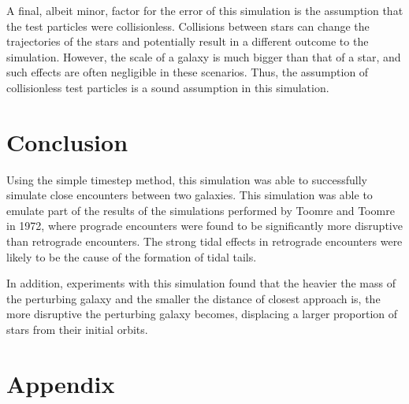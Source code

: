 \documentclass[twoside,twocolumn]{article}
\begin{document}
        A final, albeit minor, factor for the error of this simulation is the assumption that the test particles were collisionless. Collisions between stars can change the trajectories of the stars and potentially result in a different outcome to the simulation. However, the scale of a galaxy is much bigger than that of a star, and such effects are often negligible in these scenarios. Thus, the assumption of collisionless test particles is a sound assumption in this simulation. 

\section{Conclusion}

        Using the simple timestep method, this simulation was able to successfully simulate close encounters between two galaxies. This simulation was able to emulate part of the results of the simulations performed by Toomre and Toomre in 1972, where prograde encounters were found to be significantly more disruptive than retrograde encounters. The strong tidal effects in retrograde encounters were likely to be the cause of the formation of tidal tails.

        In addition, experiments with this simulation found that the heavier the mass of the perturbing galaxy and the smaller the distance of closest approach is, the more disruptive the perturbing galaxy becomes, displacing a larger proportion of stars from their initial orbits.
    

\onecolumn
\section{Appendix}
\end{document}
